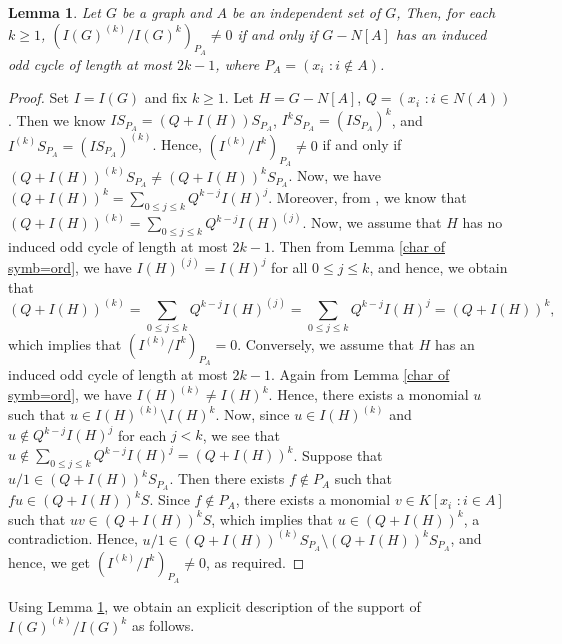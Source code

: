 \documentclass[12pt]{amsart}
\newtheorem{lemma}[thm]{Lemma}
\theoremstyle{definition}
\theoremstyle{remark}
\begin{document}
\begin{lemma}\label{criteria of neq0}
Let $G$ be a graph and $A$ be an independent set of $G$, Then, for each $k\geq1$, $(I(G)^{(k)}/I(G)^{k})_{P_{A}}\neq0$ if and only if $G-N[A]$ has an induced odd cycle of length at most $2k-1$, where $P_{A}=(x_{i}\,\,: i\notin A)$. 
\end{lemma}
\begin{proof}
Set $I=I(G)$ and fix $k\geq1$. Let $H=G-N[A]$, $Q=(x_{i}\,\,: i\in N(A))$. Then we know $IS_{P_{A}}=(Q+I(H))S_{P_{A}}$, $I^{k}S_{P_{A}}=(IS_{P_{A}})^{k}$, and $I^{(k)}S_{P_{A}}=(IS_{P_{A}})^{(k)}$. Hence, $(I^{(k)}/I^{k})_{P_{A}}\neq0$ if and only if $(Q+I(H))^{(k)}S_{P_{A}}\neq(Q+I(H))^{k}S_{P_{A}}$. Now, we have $(Q+I(H))^{k}=\sum_{0\leq j\leq k}Q^{k-j}I(H)^{j}$. Moreover, from \cite[Theorem 3.4]{hntt2020}, we know that $(Q+I(H))^{(k)}=\sum_{0\leq j\leq k}Q^{k-j}I(H)^{(j)}$. Now, we assume that $H$ has no induced odd cycle of length at most $2k-1$. Then from Lemma \ref{char of symb=ord}, we have $I(H)^{(j)}=I(H)^{j}$ for all $0\leq j\leq k$, and hence, we obtain that 
$$(Q+I(H))^{(k)}=\sum_{0\leq j\leq k}Q^{k-j}I(H)^{(j)}=\sum_{0\leq j\leq k}Q^{k-j}I(H)^{j}=(Q+I(H))^{k},$$which implies that $(I^{(k)}/I^{k})_{P_{A}}=0$. Conversely, we assume that $H$ has an induced odd cycle of length at most $2k-1$. Again from Lemma \ref{char of symb=ord}, we have $I(H)^{(k)}\neq I(H)^{k}$. Hence, there exists a monomial $u$ such that $u\in I(H)^{(k)}\setminus I(H)^{k}$. Now, since $u\in I(H)^{(k)}$ and $u\notin Q^{k-j}I(H)^{j}$ for each $j<k$, we see that $u\notin\sum_{0\leq j\leq k}Q^{k-j}I(H)^{j}=(Q+I(H))^{k}$. Suppose that $u/1\in(Q+I(H))^{k}S_{P_{A}}$. Then there exists $f\notin P_{A}$ such that $fu\in(Q+I(H))^{k}S$. Since $f\notin P_{A}$, there exists a monomial $v\in K[x_{i}\,\,: i\in A]$ such that $uv\in(Q+I(H))^{k}S$, which implies that $u\in(Q+I(H))^{k}$, a contradiction. Hence, $u/1\in(Q+I(H))^{(k)}S_{P_{A}}\setminus(Q+I(H))^{k}S_{P_{A}}$, and hence, we get $(I^{(k)}/I^{k})_{P_{A}}\neq0$, as required. 
\end{proof}

Using Lemma \ref{criteria of neq0}, we obtain an explicit description of the support of $I(G)^{(k)}/I(G)^{k}$ as follows. 
\end{document}
